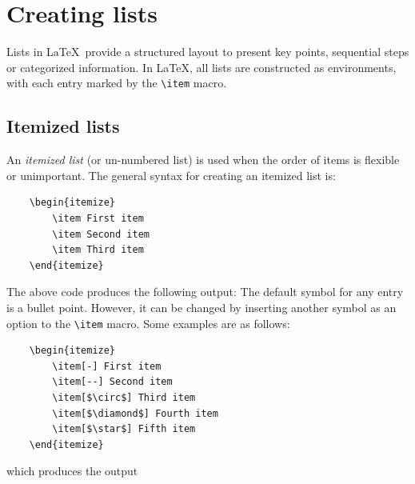 \section{Creating lists}
	Lists in \LaTeX\ provide a structured layout to present key points, sequential steps or categorized information. In \LaTeX, all lists are constructed as environments, with each entry marked by the \lstinline|\item| macro.
	
	\subsection{Itemized lists}
		An \emph{itemized list} (or un-numbered list) is used when the order of items is flexible or unimportant. The general syntax for creating an itemized list is:
\begin{lstlisting}
	\begin{itemize}
		\item First item
		\item Second item
		\item Third item
	\end{itemize}
\end{lstlisting}
		The above code produces the following output:
		The default symbol for any entry is a bullet point. However, it can be changed by inserting another symbol as an option to the \lstinline|\item| macro. Some examples are as follows:
\begin{lstlisting}
	\begin{itemize}
		\item[-] First item
		\item[--] Second item
		\item[$\circ$] Third item
		\item[$\diamond$] Fourth item
		\item[$\star$] Fifth item
	\end{itemize}
\end{lstlisting}
		which produces the output
		

